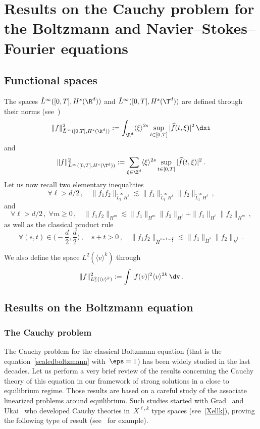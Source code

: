 \section{Results on the Cauchy problem for the Boltzmann and Navier--Stokes--Fourier equations}
\subsection{Functional spaces} The spaces $\tilde L^\infty([0,T],H^s(\R^d))$ and $\tilde L^\infty([0,T],H^s(\T^d))$ are defined through their norms (see~\cite{cheminlerner})
\[
\|f\|_{\tilde L^\infty([0,T],H^s(\R^d))}^2:= \int_{\R^d} \langle \xi \rangle^{2s} \sup_{t \in [0,T]} |\widehat f(t,\xi)|^2 \, \dxi
\]
and
\[
\|f\|_{\tilde L^\infty([0,T],H^s(\T^d))}^2:=\sum_{\xi \in \Z^d} \langle \xi \rangle^{2s} \sup_{t \in [0,T]} |\widehat f(t,\xi)|^2 \,.
\]
Let us now recall two elementary inequalities
\begin{equation}\label{lem:algebra}
\forall \ell>d/2 \,,\quad \|f_1 f_2\|_{ \tilde L^\infty_tH^\ell} \lesssim \|f_1 \|_{ \tilde L^\infty_tH^\ell} \|f_2\|_{ \tilde L^\infty_tH^\ell} \,,
\end{equation}
and
\begin{equation}\label{lem:prodHell}
\forall \ell>d/2 \,,\; \forall m\ge 0 \,, \quad
\|f_1 f_2\|_{H^{m} } \lesssim \|f_1\|_{H^{m} } \|f_2\|_{H^\ell} + \|f_1\|_{H^\ell } \|f_2\|_{H^{m} } \,,
\end{equation}
as well as the classical product rule
\begin{equation}\label{prodrules}
\forall (s,t) \in \bigg(-\frac d2,\frac d2\bigg) \,, \quad s+t>0 \,, \quad \|f_1 f_2\|_{\dot H^{s+t-\frac d2} } \lesssim \|f_1\|_{\dot H^{s} } \|f_2\|_{\dot H^t} \,.
\end{equation}



We also define the space $L^2(\langle v \rangle^k)$ through
\[
\|f\|_{L^2_v(\langle v \rangle^k)}^2:=\int |f(v)|^2 \langle v \rangle^{2k}\,\dv\,.
\]

\subsection{Results on the Boltzmann equation}\label{appendixbotlz}
\subsubsection{The Cauchy problem}
The Cauchy problem for the classical Boltzmann equation (that is the equation~\eqref{scaledboltzmann} with~$\eps=1$) has been widely studied in the last decades. Let us perform a very brief review of the results concerning the Cauchy theory of this equation in our framework of strong solutions in a close to equilibrium regime. Those results are based on a careful study of the associate linearized problems around equilibrium. Such studies started with Grad~\cite{Grad} and Ukai~\cite{Ukai} who developed Cauchy theories in~$X^{\ell,k}$ type spaces (see~\eqref{Xellk}), proving the following type of result (see~\cite{Bardos-Ukai,Glassey,Ukai} for example).

